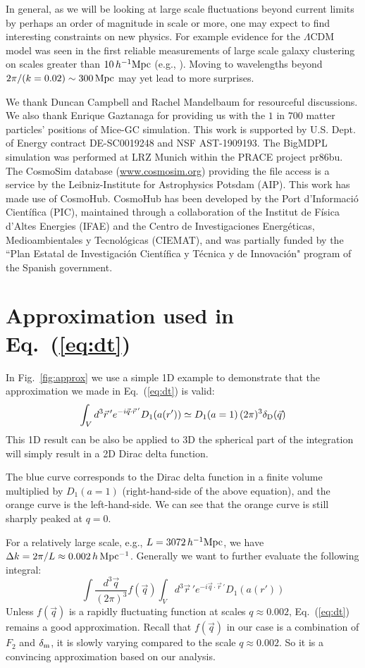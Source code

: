 \documentclass[prd,amsmath,amssymb,floatfix,superscriptaddress,nofootinbib,twocolumn]{revtex4-1}
\def\be{\begin{equation}}
\def\ee{\end{equation}}
\newcommand{\vrr}{\vec{r}}
\newcommand{\ec}[1]{Eq.~(\ref{eq:#1})}
\newcommand{\rf}[1]{\ref{fig:#1}}
\begin{document}
In general, as we will be looking at large scale fluctuations beyond current limits by perhaps an order of magnitude in scale or more, one may expect to find interesting constraints on new physics. For example evidence for the $\Lambda$CDM model was seen in the first reliable measurements of large scale galaxy clustering on scales greater than $10\,h^{-1}\rm Mpc$ (e.g., \cite{Efstathio:1990cdm}). Moving to wavelengths beyond $2\pi/(k=0.02) \sim 300 \rm \, Mpc$ may yet lead to more surprises.

\acknowledgements
We thank Duncan Campbell and Rachel Mandelbaum for resourceful discussions. We also thank Enrique Gaztanaga for providing us with the $1$ in $700$ matter particles' positions of Mice-GC simulation. This work is supported by U.S. Dept. of Energy contract DE-SC0019248 and NSF AST-1909193.
The BigMDPL simulation was performed at LRZ Munich within the PRACE project pr86bu. The CosmoSim database (\url{www.cosmosim.org}) providing the file access is a service by the Leibniz-Institute for Astrophysics Potsdam (AIP).
This work has made use of CosmoHub. CosmoHub has been developed by the Port d'Informació Científica (PIC), maintained through a collaboration of the Institut de Física d'Altes Energies (IFAE) and the Centro de Investigaciones Energéticas, Medioambientales y Tecnológicas (CIEMAT), and was partially funded by the ``Plan Estatal de Investigación Científica y Técnica y de Innovación" program of the Spanish government.
\clearpage

\appendix 

\section{Approximation used in \ec{dt}}\label{appenda}
In Fig.~\rf{approx} we use a simple 1D example to demonstrate that the approximation we made in \ec{dt} is valid:
\be 
\int_{V} d^{3}\vrr\, 'e^{-i\vec{q}\cdot \vrr\, '}{D_{1}(a(r'))}  \simeq D_{1}(a=1)\,(2\pi)^3\delta_{\rm D}(\vec{q})
\ee 
This 1D result can be also be applied to 3D the spherical part of the integration will simply result in a 2D Dirac delta function.

The blue curve corresponds to the Dirac delta function in a finite volume multiplied by $D_{1}(a=1)$ (right-hand-side of the above equation), and the orange curve is the left-hand-side. We can see that the orange curve is still sharply peaked at $q=0$. 

For a relatively large scale, e.g., $L=3072\, h^{-1}\rm Mpc$, we have $\Delta k=2\pi/L\approx 0.002 \, h \, \rm Mpc^{-1}$. Generally we want to further evaluate the following integral:
\be
\int \frac{d^{3}\vec{q}}{(2\pi)^3}f(\vec{q}) \int_{V} d^{3}\vrr\, 'e^{-i\vec{q}\cdot \vrr\, '}{D_{1}(a(r'))}
\ee 
Unless $f(\vec{q})$ is a rapidly fluctuating function at scales $q \approx 0.002$, \ec{dt} remains a good approximation. Recall that $f(\vec{q})$ in our case is a combination of $F_{2}$ and $\delta_{\rm m}$, it is slowly varying compared to the scale $q \approx 0.002$. So it is a convincing approximation based on our analysis.
\end{document}
